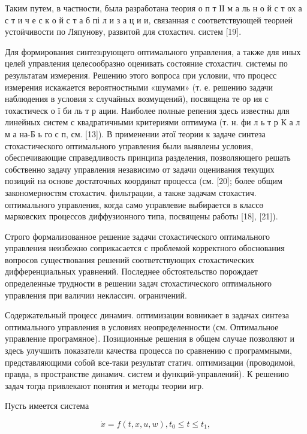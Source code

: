 \documentclass[10pt]{article}
\begin{document}
Таким путем, в частности, была разработана теория $о$ п т ІІ м а ль н о й с т ох а с т и ч е с к о й с т а б пі л и з а ц и и, связанная с соответствующей теориеӥ устоӥчивости по Ляпунову, развитой для стохастич. систем [19].



Для формирования синтезıрующего оптимального управления, а также для иных целей управления целесообразно оценивать состояние стохастич. системы по результатам измерения. Решению этого вопроса при условии, что процесс измерения искажается вероятностными «шумами» (т. е. решению задачи наблюдения в условия $\mathrm{x}$ случайных возмущений), посвящена те ор ия с тохастическ о ї би ль т р ации. Наиболее полные репения здесь известны для линейных систем с квадратичными критериями оптимума (т. н. фи л ь т р К а л м а на-Б ь го с п, см. [13]). В применении әтої теории к задаче синтеза стохастического оптимального управления были выявлены условия, обеспечивающие справедливость принципа разделения, позволяющего решать собственно задачу управления независимо от задачи оценивания текущих позиций на основе достаточных координат процесса (см. [20]; более общим закономерностям стохастич. фильтрации, а также задачам стохастич. оптимального управления, когда само управлевие выбирается в классө марковских процессов диффузионного типа, посвящены работы [18], [21]).



Строго формализованное решение задачи стохастического оптимального управления неизбежно соприкасается с проблемой корректного обоснования вопросов существования решений соответствующих стохастических дифференциальных уравнений. Последнее обстоятельство порождает определенные трудности в решении задач стохастического оптимального управления при валичии неклассич. ограничений.



Содержательный процесс динамич. оптимизации вовникает в задачах синтеза оптимального управления в условиях неопределенности (см. Оптимальное управление програмяное). Позиционные решения в общем случае позволяют и здесь улучшить показатели качества процесса по сравнению с программными, представляющими собой все-таки результат статич. оптимизации (проводимоӥ, правда, в пространстве динамич. систем и функций-управлений). К решению задач тогда привлекают понятия и методы теории игр.



Пусть имеется система



\[

\dot{x}=f(t, x, u, w), t_{0} \leqslant t \leqslant t_{1},

\]
\end{document}
